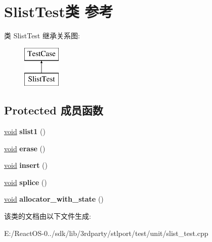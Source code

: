 \hypertarget{class_slist_test}{}\section{Slist\+Test类 参考}
\label{class_slist_test}
类 Slist\+Test 继承关系图\+:\begin{figure}[H]
\begin{center}
\leavevmode
\includegraphics[height=2.000000cm]{class_slist_test}
\end{center}
\end{figure}
\subsection*{Protected 成员函数}
\begin{DoxyCompactItemize}
\item 
\mbox{\label{class_slist_test_a100e37860dcd724c40f8c8cbf3b92248}} 
\hyperlink{interfacevoid}{void} {\bfseries slist1} ()
\item 
\mbox{\label{class_slist_test_ae996f81f76e382530520afed62dc6f1f}} 
\hyperlink{interfacevoid}{void} {\bfseries erase} ()
\item 
\mbox{\label{class_slist_test_a60b55b8565c8b8bc947ae66721d87b84}} 
\hyperlink{interfacevoid}{void} {\bfseries insert} ()
\item 
\mbox{\label{class_slist_test_a28bd25520a91e65a0cebb6a13c0b6b2b}} 
\hyperlink{interfacevoid}{void} {\bfseries splice} ()
\item 
\mbox{\label{class_slist_test_a71abf53d30dd7bc89700a1e163e93581}} 
\hyperlink{interfacevoid}{void} {\bfseries allocator\+\_\+with\+\_\+state} ()
\end{DoxyCompactItemize}


该类的文档由以下文件生成\+:\begin{DoxyCompactItemize}
\item 
E\+:/\+React\+O\+S-\/0../sdk/lib/3rdparty/stlport/test/unit/slist\+\_\+test.\+cpp\end{DoxyCompactItemize}
